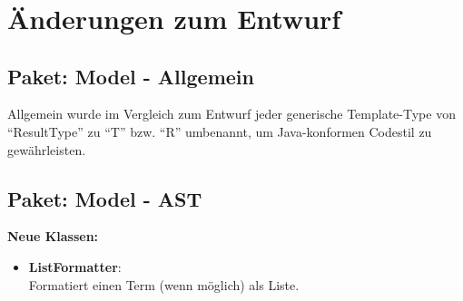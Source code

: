 \documentclass[parskip=full,11pt,twoside]{scrartcl}
\begin{document}
\begin{minipage}{0.5\textwidth}
\begin{ganttchart}[x unit = 1.0cm, y unit chart = 0.7cm]{0}{4}
	\\
\\
\\
\\
\\
\\

\\
\\
\\
\\
\\
\\

\\
\\

\\
\end{ganttchart}
\end{minipage}

\section{Änderungen zum Entwurf}

\subsection{Paket: Model - Allgemein}

Allgemein wurde im Vergleich zum Entwurf jeder generische Template-Type von \enquote{ResultType} zu \enquote{T} bzw. \enquote{R} umbenannt, um Java-konformen Codestil zu gewährleisten.

\subsection{Paket: Model - AST}

\textbf{Neue Klassen:}
\begin{itemize}
	\item \textbf{ListFormatter}:\\
	Formatiert einen Term (wenn möglich) als Liste.
\end{itemize}
\end{document}
